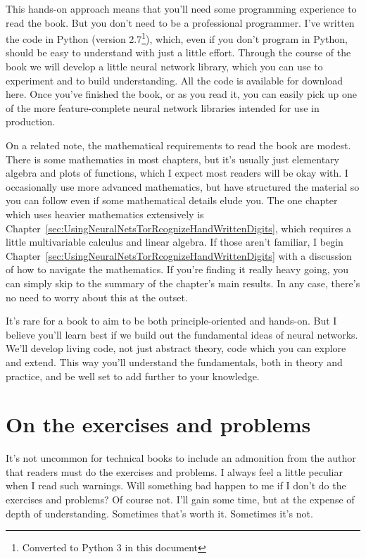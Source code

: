 This hands-on approach means that you'll need some programming experience to read the book. But you don't need to be a professional programmer. I've written the code in Python (version 2.7\footnote{Converted to Python 3 in this document}), which, even if you don't program in Python, should be easy to understand with just a little effort. Through the course of the book we will develop a little neural network library, which you can use to experiment and to build understanding. All the code is available for download here. Once you've finished the book, or as you read it, you can easily pick up one of the more feature-complete neural network libraries intended for use in production.

On a related note, the mathematical requirements to read the book are modest. There is some mathematics in most chapters, but it's usually just elementary algebra and plots of functions, which I expect most readers will be okay with. I occasionally use more advanced mathematics, but have structured the material so you can follow even if some mathematical details elude you. The one chapter which uses heavier mathematics extensively is Chapter~\ref{sec:UsingNeuralNetsTorRcognizeHandWrittenDigits}, which requires a little multivariable calculus and linear algebra. If those aren't familiar, I begin Chapter~\ref{sec:UsingNeuralNetsTorRcognizeHandWrittenDigits} with a discussion of how to navigate the mathematics. If you're finding it really heavy going, you can simply skip to the summary of the chapter's main results. In any case, there's no need to worry about this at the outset.

It's rare for a book to aim to be both principle-oriented and hands-on. But I believe you'll learn best if we build out the fundamental ideas of neural networks. We'll develop living code, not just abstract theory, code which you can explore and extend. This way you'll understand the fundamentals, both in theory and practice, and be well set to add further to your knowledge.


\section*{On the exercises and problems}

It's not uncommon for technical books to include an admonition from the author that readers must do the exercises and problems. I always feel a little peculiar when I read such warnings. Will something bad happen to me if I don't do the exercises and problems? Of course not. I'll gain some time, but at the expense of depth of understanding. Sometimes that's worth it. Sometimes it's not.


